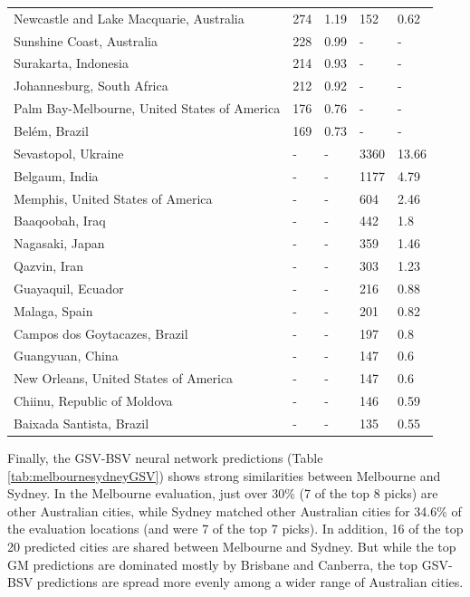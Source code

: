 \documentclass[10pt,letterpaper]{article}
\begin{document}
\begin{table}[!htbp]
\begin{adjustwidth}{-2.25in}{0in}
\begin{tabular}{ l  l l l  l}
Newcastle and Lake Macquarie, Australia & 274 & 1.19 & 152 & 0.62 \\ 
Sunshine Coast, Australia & 228 & 0.99 &-&- \\ 
Surakarta, Indonesia & 214 & 0.93 &-&- \\ 
Johannesburg, South Africa & 212 & 0.92 &-&- \\ 
Palm Bay-Melbourne, United States of America & 176 & 0.76 &-&- \\ 
Bel\'{e}m, Brazil & 169 & 0.73 &-&- \\ 
Sevastopol, Ukraine &-&- & 3360 & 13.66\\ 
Belgaum, India &-&- & 1177 & 4.79\\ 
Memphis, United States of America &-&- & 604 & 2.46\\ 
Baaqoobah, Iraq &-&- & 442 & 1.8\\ 
Nagasaki, Japan &-&- & 359 & 1.46\\ 
Qazvin, Iran &-&- & 303 & 1.23\\ 
Guayaquil, Ecuador &-&- & 216 & 0.88\\ 
Malaga, Spain &-&- & 201 & 0.82\\ 
Campos dos Goytacazes, Brazil &-&- & 197 & 0.8\\ 
Guangyuan, China &-&- & 147 & 0.6\\ 
New Orleans, United States of America &-&- & 147 & 0.6\\ 
Chiinu, Republic of Moldova &-&- & 146 & 0.59\\ 
Baixada Santista, Brazil &-&- & 135 & 0.55\\ \hline
\end{tabular}
\end{adjustwidth}
\end{table}


Finally, the GSV-BSV neural network predictions (Table \ref{tab:melbournesydneyGSV}) shows strong similarities between Melbourne and Sydney. In the Melbourne evaluation, just over 30\% (7 of the top 8 picks) are other Australian cities, while Sydney matched other Australian cities for 34.6\% of the evaluation locations (and were 7 of the top 7 picks). In addition, 16 of the top 20 predicted cities are shared between Melbourne and Sydney. But while the top GM predictions are dominated mostly by Brisbane and Canberra, the top GSV-BSV predictions are spread more evenly among a wider range of Australian cities.
\end{document}
